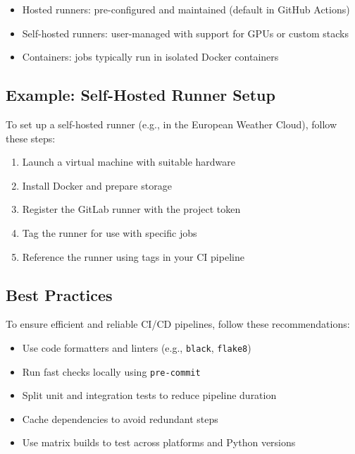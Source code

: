 \begin{itemize}
\item Hosted runners: pre-configured and maintained (default in GitHub Actions)
\item Self-hosted runners: user-managed with support for GPUs or custom stacks
\item Containers: jobs typically run in isolated Docker containers
\end{itemize}

%
\subsection{Example: Self-Hosted Runner Setup}
To set up a self-hosted runner (e.g., in the European Weather Cloud), follow these steps:

\begin{enumerate}
\item Launch a virtual machine with suitable hardware
\item Install Docker and prepare storage
\item Register the GitLab runner with the project token
\item Tag the runner for use with specific jobs
\item Reference the runner using tags in your CI pipeline
\end{enumerate}

%
\subsection{Best Practices}
To ensure efficient and reliable CI/CD pipelines, follow these recommendations:

\begin{itemize}
\item Use code formatters and linters (e.g., \texttt{black}, \texttt{flake8})
\item Run fast checks locally using \texttt{pre-commit}
\item Split unit and integration tests to reduce pipeline duration
\item Cache dependencies to avoid redundant steps
\item Use matrix builds to test across platforms and Python versions
\end{itemize}

